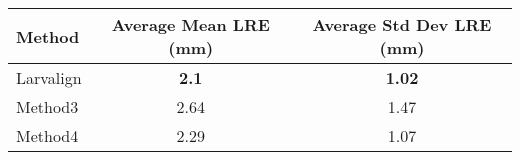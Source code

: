 \begin{tabular}{lcc}
\hline
 ﻿Method   & Average Mean LRE (mm) & Average Std Dev LRE (mm) \\ \hline \hline
 Larvalign & \textbf{2.1}               & \textbf{1.02}                 \\
 Method3   & 2.64              & 1.47                 \\
 Method4   & 2.29              & 1.07                 \\
\hline
\end{tabular}